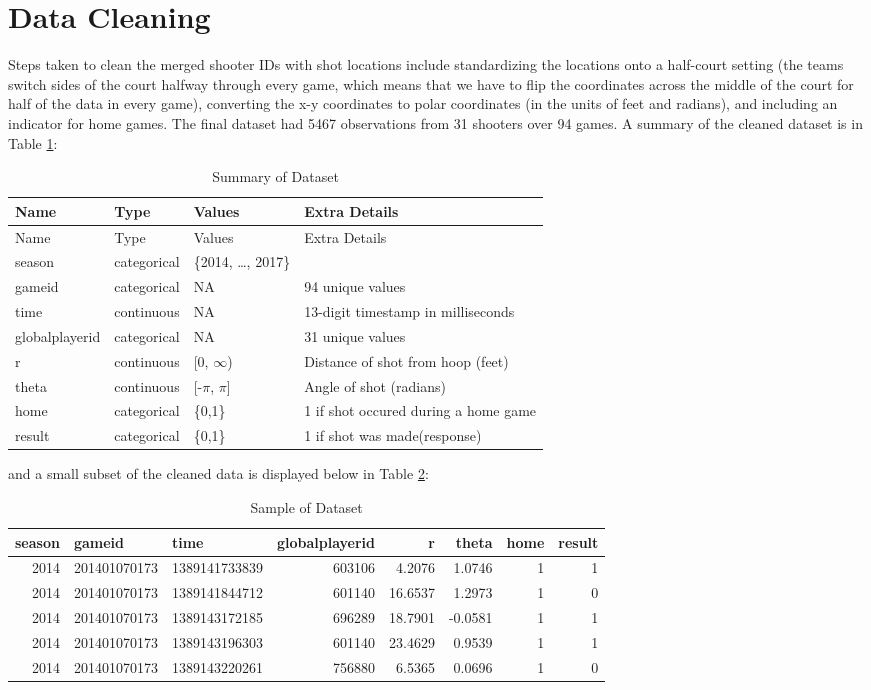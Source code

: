 \documentclass[12pt,twoside]{dukestatscithesis}
\theoremstyle{definition}
\theoremstyle{definition}
\theoremstyle{definition}
\theoremstyle{remark}
\begin{document}
\section{Data Cleaning}\label{data-cleaning}

Steps taken to clean the merged shooter IDs with shot locations include
standardizing the locations onto a half-court setting (the teams switch
sides of the court halfway through every game, which means that we have
to flip the coordinates across the middle of the court for half of the
data in every game), converting the x-y coordinates to polar coordinates
(in the units of feet and radians), and including an indicator for home
games. The final dataset had 5467 observations from 31 shooters over 94
games. A summary of the cleaned dataset is in Table
\ref{tab:summarytable}:
\begin{longtable}[]{@{}llll@{}}
\caption{\label{tab:summarytable}Summary of Dataset}\tabularnewline
\toprule
Name & Type & Values & Extra Details\tabularnewline
\midrule
\endfirsthead
\toprule
Name & Type & Values & Extra Details\tabularnewline
\midrule
\endhead
season & categorical & \{2014, \ldots{}, 2017\} &\tabularnewline
gameid & categorical & NA & 94 unique values\tabularnewline
time & continuous & NA & 13-digit timestamp in
milliseconds\tabularnewline
globalplayerid & categorical & NA & 31 unique values\tabularnewline
r & continuous & {[}0, \(\infty\)) & Distance of shot from hoop
(feet)\tabularnewline
theta & continuous & {[}-\(\pi\), \(\pi\){]} & Angle of shot
(radians)\tabularnewline
home & categorical & \{0,1\} & 1 if shot occured during a home
game\tabularnewline
result & categorical & \{0,1\} & 1 if shot was
made(response)\tabularnewline
\bottomrule
\end{longtable}
and a small subset of the cleaned data is displayed below in Table
\ref{tab:sampletable}:

\begingroup\fontsize{11}{13}\selectfont
\begin{longtable}[t]{rllrrrrr}
\caption[Data Sample]{\label{tab:sampletable}Sample of Dataset}\\
\toprule
season & gameid & time & globalplayerid & r & theta & home & result\\
\midrule
2014 & 201401070173 & 1389141733839 & 603106 & 4.2076 & 1.0746 & 1 & 1\\
2014 & 201401070173 & 1389141844712 & 601140 & 16.6537 & 1.2973 & 1 & 0\\
2014 & 201401070173 & 1389143172185 & 696289 & 18.7901 & -0.0581 & 1 & 1\\
2014 & 201401070173 & 1389143196303 & 601140 & 23.4629 & 0.9539 & 1 & 1\\
2014 & 201401070173 & 1389143220261 & 756880 & 6.5365 & 0.0696 & 1 & 0\\
\bottomrule
\end{longtable}
\endgroup{}
\end{document}
